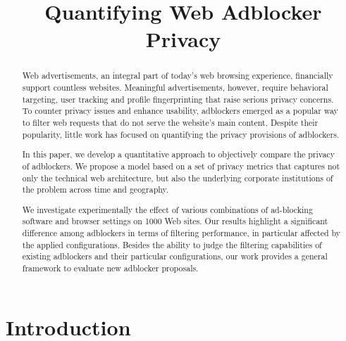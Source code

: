 \documentclass[compsoc, conference, letterpaper, 10pt, times]{IEEEtran}
\begin{document}
\title{Quantifying Web Adblocker Privacy}

\author{
}

\maketitle

\begin{abstract}

Web advertisements, an integral part of today's web browsing experience, financially support countless websites. Meaningful advertisements, however, require behavioral targeting, user tracking and profile fingerprinting that raise serious privacy concerns. To counter privacy issues and enhance usability, adblockers emerged as a popular way to filter web requests that do not serve the website's main content. Despite their popularity, little work has focused on quantifying the privacy provisions of adblockers.

In this paper, we develop a quantitative approach to objectively compare the privacy of adblockers. We propose a model based on a set of privacy metrics that captures not only the technical web architecture, but also the underlying corporate institutions of the problem across time and geography.

We investigate experimentally the effect of various combinations of ad-blocking software and browser settings on 1000 Web sites. Our results highlight a significant difference among adblockers in terms of filtering performance, in particular affected by the applied configurations. Besides the ability to judge the filtering capabilities of existing adblockers and their particular configurations, our work provides a general framework to evaluate new adblocker proposals.

\end{abstract}

\section{Introduction} \label{sec:introduction}
\end{document}
